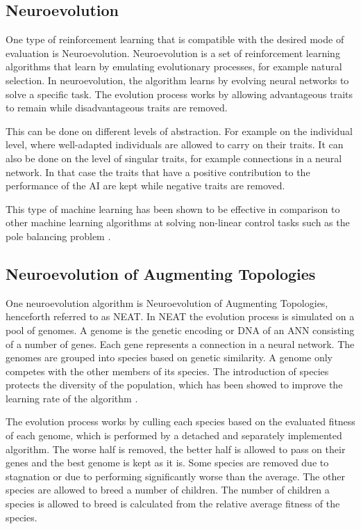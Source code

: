 \subsection{Neuroevolution}
One type of reinforcement learning that is  compatible with the desired mode of evaluation is Neuroevolution. Neuroevolution is a set of reinforcement learning algorithms that learn by emulating evolutionary processes, for example natural selection. In neuroevolution, the algorithm learns by evolving neural networks to solve a specific task. The evolution process works by allowing advantageous traits to remain while disadvantageous traits are removed.  

This can be done on different levels of abstraction. For example on the individual level, where well-adapted individuals are allowed to carry on their traits. It can also be done on the level of singular traits, for example connections in a neural network. In that case the traits that have a positive contribution to the performance of the AI are kept while negative traits are removed. 

This type of machine learning has been shown to be effective in comparison to other machine learning algorithms at solving non-linear control tasks such as the pole balancing problem \cite{gomez:efficient_nonlinear_control}.

\subsection{Neuroevolution of Augmenting Topologies}
One neuroevolution algorithm is Neuroevolution of Augmenting Topologies, henceforth referred to as NEAT. In NEAT the evolution process is simulated on a pool of genomes. A genome is the genetic encoding or DNA of an ANN consisting of a number of genes. Each gene represents a connection in a neural network. The genomes are grouped into species based on genetic similarity. A genome only competes with the other members of its species. The introduction of species protects the diversity of the population, which has been showed to improve the learning rate of the algorithm \cite{stanley:neat}.  

The evolution process works by culling each species based on the evaluated fitness of each genome, which is performed by a detached and separately implemented algorithm. The worse half is removed, the better half is allowed to pass on their genes and the best genome is kept as it is. Some species are removed due to stagnation or due to performing significantly worse than the average. The other species are allowed to breed a number of children. The number of children a species is allowed to breed is calculated from the relative average fitness of the species. 

